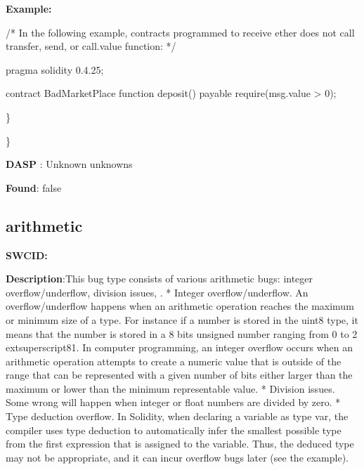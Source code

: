 \documentclass{article}
\begin{document}
\textbf{Example:} 
\begin{ffcode} 

/* In the following example, contracts programmed to receive ether does not call transfer, send, or call.value function: */ 

pragma solidity 0.4.25;

contract BadMarketPlace {
    function deposit() payable {
        require(msg.value > 0);
    }
}

\end{ffcode} 
\} 

\} 

\textbf{DASP} : Unknown unknowns

\textbf{Found}: false

\subsection{arithmetic} 
\textbf{SWC{\textunderscore }ID:} 

\textbf{Description}:This bug type consists of various arithmetic bugs: integer overflow/underflow, division issues, .
* Integer overflow/underflow. An overflow/underflow happens when an arithmetic operation reaches the maximum or minimum size of a type. For instance if a number is stored in the uint8 type, it means that the number is stored in a 8 bits unsigned number ranging from 0 to 2{	extsuperscript}8{\textendash}1. In computer programming, an integer overflow occurs when an arithmetic operation attempts to create a numeric value that is outside of the range that can be represented with a given number of bits either larger than the maximum or lower than the minimum representable value.
* Division issues. Some wrong will happen when integer or float numbers are divided by zero.
* Type deduction overflow. In Solidity, when declaring a variable as type var, the compiler uses type deduction to automatically infer the smallest possible type from the first expression that is assigned to the variable. Thus, the deduced type may not be appropriate, and it can incur overflow bugs later (see the example).
\end{document}
